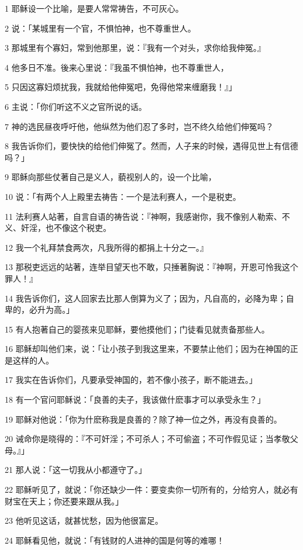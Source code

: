 \par 1 耶稣设一个比喻，是要人常常祷告，不可灰心。
\par 2 说：「某城里有一个官，不惧怕神，也不尊重世人。
\par 3 那城里有个寡妇，常到他那里，说：『我有一个对头，求你给我伸冤。』
\par 4 他多日不准。後来心里说：『我虽不惧怕神，也不尊重世人，
\par 5 只因这寡妇烦扰我，我就给他伸冤吧，免得他常来缠磨我！』」
\par 6 主说：「你们听这不义之官所说的话。
\par 7 神的选民昼夜呼吁他，他纵然为他们忍了多时，岂不终久给他们伸冤吗？
\par 8 我告诉你们，要快快的给他们伸冤了。然而，人子来的时候，遇得见世上有信德吗？」
\par 9 耶稣向那些仗著自己是义人，藐视别人的，设一个比喻，
\par 10 说：「有两个人上殿里去祷告：一个是法利赛人，一个是税吏。
\par 11 法利赛人站著，自言自语的祷告说：『神啊，我感谢你，我不像别人勒索、不义、奸淫，也不像这个税吏。
\par 12 我一个礼拜禁食两次，凡我所得的都捐上十分之一。』
\par 13 那税吏远远的站著，连举目望天也不敢，只捶著胸说：『神啊，开恩可怜我这个罪人！』
\par 14 我告诉你们，这人回家去比那人倒算为义了；因为，凡自高的，必降为卑；自卑的，必升为高。」
\par 15 有人抱著自己的婴孩来见耶稣，要他摸他们；门徒看见就责备那些人。
\par 16 耶稣却叫他们来，说：「让小孩子到我这里来，不要禁止他们；因为在神国的正是这样的人。
\par 17 我实在告诉你们，凡要承受神国的，若不像小孩子，断不能进去。」
\par 18 有一个官问耶稣说：「良善的夫子，我该做什麽事才可以承受永生？」
\par 19 耶稣对他说：「你为什麽称我是良善的？除了神一位之外，再没有良善的。
\par 20 诫命你是晓得的：『不可奸淫；不可杀人；不可偷盗；不可作假见证；当孝敬父母。』」
\par 21 那人说：「这一切我从小都遵守了。」
\par 22 耶稣听见了，就说：「你还缺少一件：要变卖你一切所有的，分给穷人，就必有财宝在天上；你还要来跟从我。」
\par 23 他听见这话，就甚忧愁，因为他很富足。
\par 24 耶稣看见他，就说：「有钱财的人进神的国是何等的难哪！
